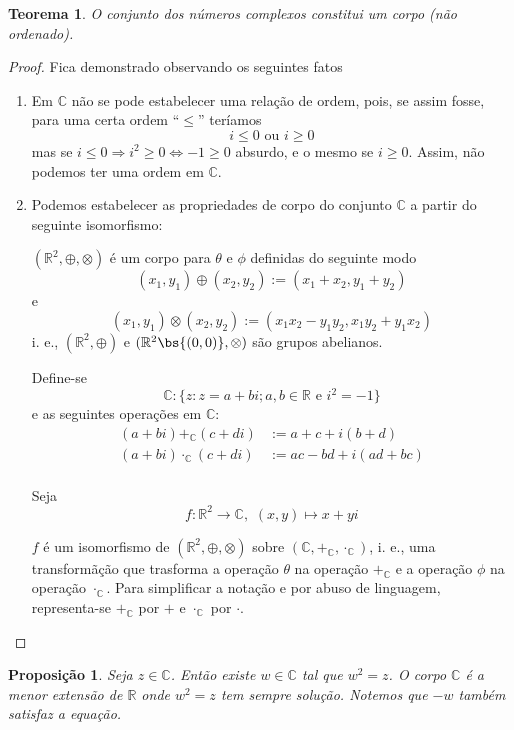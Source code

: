 \documentclass[12pt, oneside, a4paper, english, brazil]{abntex2}
\providecommand{\Rdois}{\mathbb{R}^2}
\newcommand{\C}{\mathbb{C}}
\newcounter{geral}
\theoremstyle{normal}
\newtheorem{proposition}[geral]{Proposição}
\newtheorem{theorem}[geral]{Teorema}
\theoremstyle{observacao}
\begin{document}
\begin{theorem}
O conjunto dos números complexos constitui um corpo (não ordenado).
\end{theorem}
\begin{proof}
Fica demonstrado observando os seguintes fatos
\begin{enumerate}
\item Em $\C$ não se pode estabelecer uma relação de ordem, pois, se assim
fosse, para uma certa ordem ``$\leq$'' teríamos
\[
i \leq 0 \text{ ou } i \geq 0
\]
mas se $i \leq 0 \Rightarrow i^2 \geq 0 \Leftrightarrow -1 \geq 0$ absurdo, e o mesmo se $i\geq 0$. Assim, não podemos ter uma ordem em $\C$.

\item Podemos estabelecer as propriedades de corpo do conjunto $\C$ a partir do seguinte isomorfismo:

$(\Rdois, \oplus, \otimes)$ é um corpo para $\theta$ e $\phi$ definidas do seguinte modo
\[
(x_1,y_1) \oplus (x_2,y_2):=(x_1+x_2,y_1+y_2)
\]
e
\[
(x_1,y_1) \otimes (x_2,y_2):=(x_1x_2 - y_1y_2, x_1y_2 + y_1x_2)
\]
i. e., $(\Rdois, \oplus)$ e $(\Rdois \bs \{(0,0)\}, \otimes)$ são grupos abelianos.

Define-se
\[
\C:\{z : z=a+bi; a,b \in \mathbb{R}\text{ e } i^2=-1\}
\]
e as seguintes operações em $\C$:
\begin{align*}
(a+bi) +_{\C} (c+di) &:= a+c +i(b+d)\\
(a+bi) \cdot_{\C} (c+di) &:= ac-bd+i(ad+bc)\\
\end{align*}

Seja
\[
f : \Rdois \rightarrow \C, \,\,(x,y) \mapsto x+yi
\]

$f$ é um isomorfismo de $(\Rdois, \oplus, \otimes)$ sobre $(\C, +_{\C}, \cdot_{\C})$, i. e., uma transformãção que trasforma a operação $\theta$ na operação $+_{\C}$ e a operação $\phi$ na operação $\cdot_{\C}$. Para simplificar a notação e por abuso de linguagem, representa-se $+_{\C}$ por $+$ e $\cdot_{\C}$ por $\cdot$.
\end{enumerate}
\end{proof}

\begin{proposition}
Seja $z \in \C$. Então existe $w \in \C$ tal que $w^2 = z$. O corpo $\C$ é a menor extensão de $\mathbb{R}$ onde $w^2=z$ tem sempre solução. Notemos que $-w$ também satisfaz a equação. \label{prop5}
\end{proposition}
\end{document}
